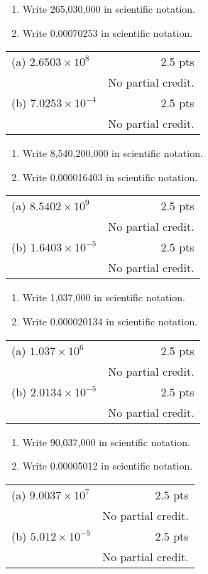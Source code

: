 {
	\begin{enumerate}
	\item Write 265,030,000 in scientific notation.
	\begin{onlyproblem}\spc\end{onlyproblem}
	\item Write 0.00070253 in scientific notation.
	\end{enumerate}
}
{
	\begin{tabular}{l r}
	(a) $2.6503 \times 10^8$ &  2.5 pts\\
	& No partial credit.\\
	(b) $7.0253 \times 10^{-4}$ & 2.5 pts\\
	& No partial credit.
	\end{tabular}
}

{
	\begin{enumerate}
	\item Write 8,540,200,000 in scientific notation.
	\begin{onlyproblem}\spc\end{onlyproblem}
	\item Write 0.000016403 in scientific notation.
	\end{enumerate}
}
{
	\begin{tabular}{l r}
	(a) $8.5402 \times 10^9$ & 2.5 pts\\
	& No partial credit.\\
	(b) $1.6403\times 10^{-5}$ & 2.5 pts\\
	& No partial credit.
	\end{tabular}
}

{
	\begin{enumerate}
	\item Write 1,037,000 in scientific notation.
	\begin{onlyproblem}\spc\end{onlyproblem}
	\item Write 0.000020134 in scientific notation.
	\end{enumerate}
}
{
	\begin{tabular}{l r}
	(a) $1.037\times 10^6$ & 2.5 pts\\
	& No partial credit.\\
	(b) $2.0134\times 10^{-5}$ & 2.5 pts\\
	& No partial credit.
	\end{tabular}
}

{
	\begin{enumerate}
	\item Write 90,037,000 in scientific notation.
	\begin{onlyproblem}\spc\end{onlyproblem}
	\item Write 0.00005012 in scientific notation.
	\end{enumerate}
}
{
	\begin{tabular}{l r}
	(a) $9.0037\times 10^7$ & 2.5 pts\\
	& No partial credit.\\
	(b) $5.012\times 10^{-5}$ & 2.5 pts\\
	& No partial credit.
	\end{tabular}
}
